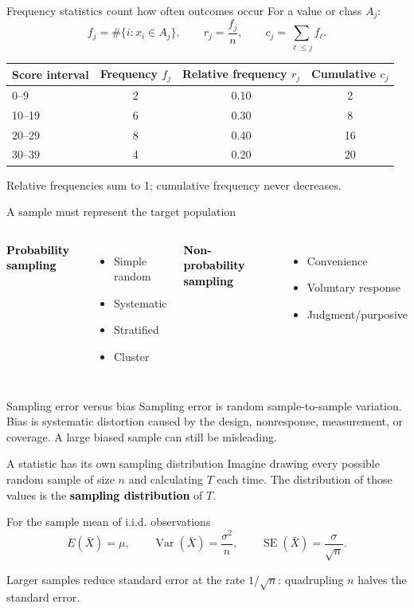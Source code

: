 \documentclass[aspectratio=169,11pt]{beamer}
\newcommand{\key}[1]{\textcolor{black}{\textbf{#1}}}
\begin{document}
\begin{frame}{Frequency statistics count how often outcomes occur}
For a value or class $A_j$:
\[
f_j=\#\{i:x_i\in A_j\},\qquad r_j=\frac{f_j}{n},\qquad c_j=\sum_{\ell\le j}f_\ell.
\]
\begin{center}
\begin{tabular}{lccc}
\toprule
Score interval & Frequency $f_j$ & Relative frequency $r_j$ & Cumulative $c_j$\\
\midrule
0--9 & 2 & 0.10 & 2\\
10--19 & 6 & 0.30 & 8\\
20--29 & 8 & 0.40 & 16\\
30--39 & 4 & 0.20 & 20\\
\bottomrule
\end{tabular}
\end{center}
Relative frequencies sum to 1; cumulative frequency never decreases.
\end{frame}

\begin{frame}{A sample must represent the target population}
\begin{columns}[T]
\key{Probability sampling}
\begin{itemize}
  \item Simple random
  \item Systematic
  \item Stratified
  \item Cluster
\end{itemize}
\key{Non-probability sampling}
\begin{itemize}
  \item Convenience
  \item Voluntary response
  \item Judgment/purposive
\end{itemize}
\end{columns}
\begin{block}{Sampling error versus bias}
Sampling error is random sample-to-sample variation. Bias is systematic distortion caused by the design, nonresponse, measurement, or coverage. A large biased sample can still be misleading.
\end{block}
\end{frame}

\begin{frame}{A statistic has its own sampling distribution}
Imagine drawing every possible random sample of size $n$ and calculating $T$ each time. The distribution of those values is the \key{sampling distribution} of $T$.
\begin{block}{For the sample mean of i.i.d. observations}
\[
E(\bar{X})=\mu,\qquad \operatorname{Var}(\bar{X})=\frac{\sigma^2}{n},\qquad \operatorname{SE}(\bar{X})=\frac{\sigma}{\sqrt n}.
\]
\end{block}
Larger samples reduce standard error at the rate $1/\sqrt n$: quadrupling $n$ halves the standard error.
\end{frame}
\end{document}
